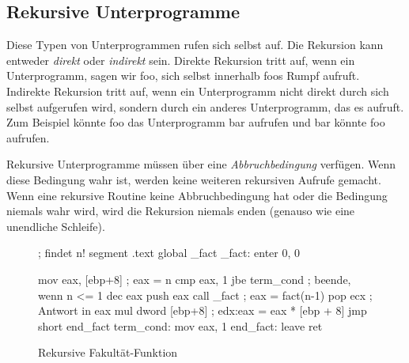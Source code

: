 \subsection{Rekursive Unterprogramme}

Diese Typen von Unterprogrammen rufen sich selbst auf. Die Rekursion
kann entweder \emph{direkt} oder \emph{indirekt} sein. Direkte
Rekursion tritt auf, wenn ein Unterprogramm, sagen wir {\code foo},
sich selbst innerhalb {\code foo}s Rumpf aufruft. Indirekte
Rekursion tritt auf, wenn ein Unterprogramm nicht direkt durch sich
selbst aufgerufen wird, sondern durch ein anderes Unterprogramm, das
es aufruft. Zum Beispiel k\"{o}nnte {\code foo} das Unterprogramm {\code
bar} aufrufen und {\code bar} k\"{o}nnte {\code foo} aufrufen.

Rekursive Unterprogramme m\"{u}ssen \"{u}ber eine \emph{Abbruchbedingung}
verf\"{u}gen. Wenn diese Bedingung wahr ist, werden keine weiteren
rekursiven Aufrufe gemacht. Wenn eine rekursive Routine keine
Abbruchbedingung hat oder die Bedingung niemals wahr wird, wird die
Rekursion niemals enden (genauso wie eine unendliche Schleife).

\begin{figure}
\begin{AsmCodeListing}[frame=single, numbers=left]
 ; findet n!
 segment .text
       global _fact
 _fact:
       enter  0, 0

       mov    eax, [ebp+8]    ; eax = n
       cmp    eax, 1
       jbe    term_cond       ; beende, wenn n <= 1
       dec    eax
       push   eax
       call   _fact           ; eax = fact(n-1)
       pop    ecx             ; Antwort in eax
       mul    dword [ebp+8]   ; edx:eax = eax * [ebp + 8]
       jmp    short end_fact
 term_cond:
       mov    eax, 1
 end_fact:
       leave
       ret
\end{AsmCodeListing}
\caption{Rekursive Fakult\"{a}t-Funktion\label{fig:factorial}}
\end{figure}


